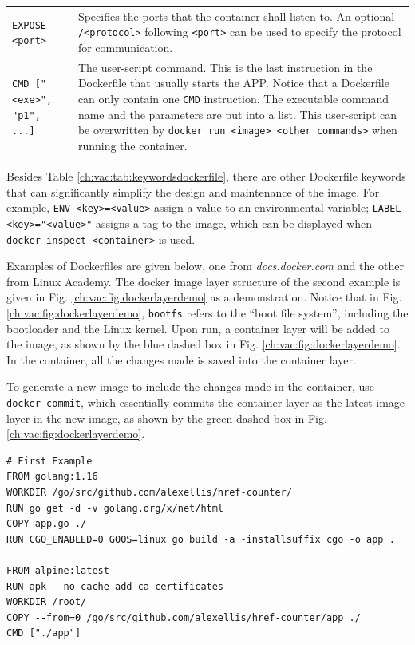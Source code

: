 \begin{table}[!htbp]
\begin{tabularx}{\textwidth}{lX}
		\verb|EXPOSE <port>| & Specifies the ports that the container shall listen to. An optional \verb|/<protocol>| following \verb|<port>| can be used to specify the protocol for communication. \\ 
		\verb|CMD ["<exe>", "p1", ...]| & The user-script command. This is the last instruction in the Dockerfile that usually starts the APP. Notice that a Dockerfile can only contain one \verb|CMD| instruction. The executable command name and the parameters are put into a list. This user-script can be overwritten by \texttt{docker run <image> <other commands>} when running the container. \\
		\hline
	\end{tabularx}
\end{table}

Besides Table \ref{ch:vac:tab:keywordsdockerfile}, there are other Dockerfile keywords that can significantly simplify the design and maintenance of the image. For example, \verb|ENV <key>=<value>| assign a value to an environmental variable; \verb|LABEL <key>="<value>"| assigns a tag to the image, which can be displayed when \verb|docker inspect <container>| is used.

Examples of Dockerfiles are given below, one from \textit{docs.docker.com} and the other from Linux Academy. The docker image layer structure of the second example is given in Fig. \ref{ch:vac:fig:dockerlayerdemo} as a demonstration. Notice that in Fig. \ref{ch:vac:fig:dockerlayerdemo}, \verb|bootfs| refers to the ``boot file system'', including the bootloader and the Linux kernel. Upon run, a container layer will be added to the image, as shown by the blue dashed box in Fig. \ref{ch:vac:fig:dockerlayerdemo}. In the container, all the changes made is saved into the container layer.

To generate a new image to include the changes made in the container, use \verb|docker commit|, which essentially commits the container layer as the latest image layer in the new image, as shown by the green dashed box in Fig. \ref{ch:vac:fig:dockerlayerdemo}.

\begin{lstlisting}
# First Example
FROM golang:1.16
WORKDIR /go/src/github.com/alexellis/href-counter/
RUN go get -d -v golang.org/x/net/html
COPY app.go ./
RUN CGO_ENABLED=0 GOOS=linux go build -a -installsuffix cgo -o app .

FROM alpine:latest
RUN apk --no-cache add ca-certificates
WORKDIR /root/
COPY --from=0 /go/src/github.com/alexellis/href-counter/app ./
CMD ["./app"]
\end{lstlisting}

